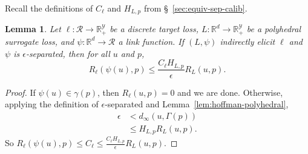 \documentclass[11pt]{article}
\newcommand{\reals}{\mathbb{R}}
\newcommand{\R}{\mathcal{R}}
\newcommand{\Y}{\mathcal{Y}}
\newtheorem{lemma}{Lemma}
\begin{document}
Recall the definitions of $C_\ell$ and $H_{L,p}$ from \S~\ref{sec:equiv-sep-calib}.

\begin{lemma}\label{lem:separated-constant-p}
  Let $\ell: \R \to \reals_+^{\Y}$ be a discrete target loss, $L: \reals^d \to \reals_+^{\Y}$ be a polyhedral surrogate loss, and $\psi: \reals^d \to \R$ a link function.
  If $(L,\psi)$ indirectly elicit $\ell$ and $\psi$ is $\epsilon$-separated, then for all $u$ and $p$,
    \[ R_{\ell}(\psi(u),p) \leq \frac{C_{\ell} H_{L,p}}{\epsilon} R_L(u,p) . \]
\end{lemma}
\begin{proof}
  If $\psi(u) \in \gamma(p)$, then $R_{\ell}(u,p) = 0$ and we are done.
  Otherwise, applying the definition of $\epsilon$-separated and Lemma~\ref{lem:hoffman-polyhedral},
  \begin{align*}
    \epsilon &<    d_{\infty}(u,\Gamma(p))  \\
             &\leq H_{L,p} R_L(u,p) .
  \end{align*}
  So $R_{\ell}(\psi(u),p) \leq C_{\ell} \leq \frac{C_{\ell} H_{L,p}}{\epsilon} R_L(u,p)$.
\end{proof}
\end{document}
